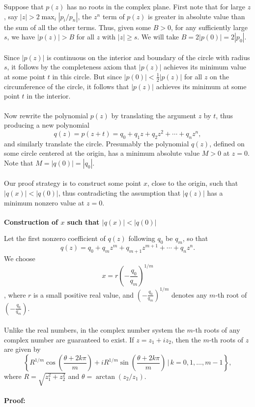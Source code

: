 Suppose that \(p(z)\) has no roots in the complex plane. First note that for large \(z\), say \(|z| > 2 \max_i |p_i/p_n|\), the \(z^n\) term of \(p(z)\) is greater in absolute 
value than the sum of all the other terms. Thus, given some \(B > 0\), for any sufficiently large \(s\), we have \(|p(z)| > B\) for all \(z\) with \(|z| \geq s\). We will take \(B = 2|p(0)| = 2|p_0|\).
\\\\
Since \(|p(z)|\) is continuous on the interior and boundary of the circle with radius \(s\), it follows by the completeness axiom that \(|p(z)|\) achieves its minimum value at some point \(t\) in this circle. But since \(|p(0)| < \frac{1}{2} |p(z)|\) for all \(z\) on the circumference of the circle, it follows that \(|p(z)|\) achieves its minimum at some point \(t\) in the interior.
\\\\
Now rewrite the polynomial \(p(z)\) by translating the argument \(z\) by \(t\), thus producing a new polynomial
\[
	q(z) = p(z + t) = q_0 + q_1 z + q_2 z^2 + \cdots + q_n z^n,
\]
and similarly translate the circle. Presumably the polynomial \(q(z)\), defined on some circle centered at the origin, has a minimum absolute value \(M > 0\) at \(z = 0\). Note that \(M = |q(0)| = |q_0|\).
\\\\
Our proof strategy is to construct some point \(x\), close to the origin, such that \(|q(x)| < |q(0)|\), thus contradicting the assumption that \(|q(z)|\) has a minimum nonzero value at \(z = 0\).
\\\\
\textbf{Construction of \(x\) such that \(|q(x)| < |q(0)|\)}

Let the first nonzero coefficient of \(q(z)\) following \(q_0\) be \(q_m\), so that
\[
	q(z) = q_0 + q_m z^m + q_{m+1} z^{m+1} + \cdots + q_n z^n.
\]
We choose
\[
	x = r {\left(-\frac{q_0}{q_m}\right)}^{1/m}
\]
, where \(r\) is a small positive real value, and \({\left(-\frac{q_0}{q_m}\right)}^{1/m}\) denotes any \(m\)-th root of \(\left(-\frac{q_0}{q_m}\right)\).
\\\\
Unlike the real numbers, in the complex number system the \(m\)-th roots of any complex number are guaranteed to exist. If \(z = z_1 + i z_2\), then the \(m\)-th roots of \(z\) are given by
\[
	\left\{ R^{1/m} \cos\left(\frac{\theta + 2k\pi}{m}\right) + i R^{1/m} \sin\left(\frac{\theta + 2k\pi}{m}\right) \,\bigg|\, k = 0, 1, \ldots, m-1 \right\},
\]
where \(R = \sqrt{z_1^2 + z_2^2}\) and \(\theta = \arctan(z_2 / z_1)\).
\\\\
\textbf{Proof:} 

